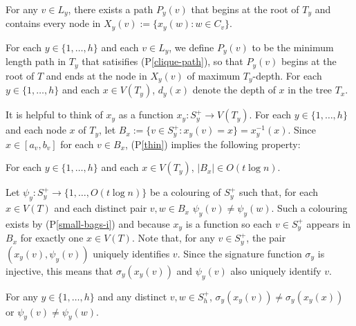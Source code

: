 \documentclass{patmorin}
\newcommand{\pref}[1]{(P\ref{#1})}
\begin{document}
\begin{compactenum}[(P1)]\setcounter{enumi}{1}
    \item For any $v\in L_y$, there exists a path $P_y(v)$ that begins at the root of $T_y$ and contains every node in $X_y(v):=\{x_{y}(w): w\in C_v\}$.\label{clique-path}
\end{compactenum}

For each $y\in\{1,\ldots,h\}$ and each $v\in L_y$, we define $P_y(v)$ to be the minimum length path in $T_y$ that satisifies \pref{clique-path}, so that $P_y(v)$ begins at the root of $T$ and ends at the node in $X_y(v)$ of maximum $T_y$-depth. For each $y\in\{1,\ldots,h\}$ and each $x\in V(T_y)$, $d_y(x)$ denote the depth of $x$ in the tree $T_x$.

It is helpful to think of $x_y$ as a function $x_y:S^+_y\to V(T_y)$.  For each $y\in\{1,\ldots,h\}$ and each node $x$ of $T_y$, let $B_x:=\{v\in S^+_y: x_y(v)=x\}=x_y^{-1}(x)$.  Since $x\in[a_v,b_v]$ for each $v\in B_x$, \pref{thin} implies the following property:

\begin{compactenum}[(P1)]\setcounter{enumi}{2}
    \item For each $y\in\{1,\ldots,h\}$ and each $x\in V(T_y)$, $|B_x|\in O(t\log n)$. \label{small-bags-i}
\end{compactenum}

Let $\psi_y:S^+_y\to\{1,\ldots,O(t\log n)\}$ be a colouring of $S^+_y$ such that, for each $x\in V(T)$ and each distinct pair $v,w\in B_x$ $\psi_y(v)\neq\psi_y(w)$.  Such a colouring exists by \pref{small-bags-i} and because $x_y$ is a function so each $v\in S^+_y$ appears in $B_x$ for exactly one $x\in V(T)$.  Note that, for any $v\in S^+_y$, the pair $(x_y(v), \psi_y(v))$ uniquely identifies $v$.  Since the signature function $\sigma_y$ is injective, this means that $\sigma_y(x_y(v))$ and $\psi_y(v)$ also uniquely identify $v$.

\begin{compactenum}[(P1)]\setcounter{enumi}{3}
    \item For any $y\in\{1,\ldots,h\}$ and any distinct $v,w\in S^+_h$, $\sigma_y(x_y(v))\neq \sigma_y(x_y(x)) $ or $\psi_y(v)\neq\psi_y(w)$.\label{unique-match}
\end{compactenum}
\end{document}
